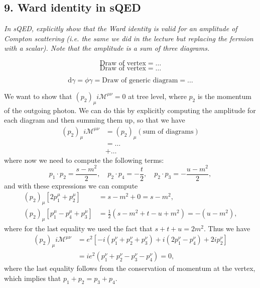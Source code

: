 \subsection*{9. Ward identity in sQED}

\begin{center}
    \textit{In sQED, explicitly show that the Ward identity is valid for an amplitude of Compton scattering (i.e. the same we did in the lecture but replacing the fermion with a scalar). Note that the amplitude is a sum of three diagrams.}
\end{center}

\[
    \text{Draw of vertex} = \dots
\]
\[
    \text{Draw of vertex} = \dots
\]

\[
    \mathrm{d} \gamma = \phi \gamma = \text{Draw of generic diagram} = \dots
\]

We want to show that \((p_2)_\mu i \mathcal{M}^{\mu \nu} = 0\) at tree level, where \(p_2\) is the momentum of the outgoing photon. We can do this by explicitly computing the amplitude for each diagram and then summing them up, so that we have
\[
    \begin{aligned}
        (p_2)_\mu i \mathcal{M}^{\mu \nu} & = (p_2)_\mu (\text{sum of diagrams}) \\
                                          & = \dots                              \\
                                          & + \dots
    \end{aligned}
\]
where now we need to compute the following terms:
\[
    p_1 \cdot p_2 = \frac{s - m^2}{2}, \quad p_2 \cdot p_4 = -\frac{t}{2}, \quad p_2 \cdot p_3 = - \frac{u - m^2}{2},
\]
and with these expressions we can compute
\[
    \begin{aligned}
        (p_2)_\mu [2p_1^{\mu} + p_2^{\mu}]            & = s - m^2 + 0 = s - m^2,                             \\
        (p_2)_\mu [p_1^{\mu} - p_4^{\mu} + p_3^{\mu}] & = \frac{1}{2} (s - m^2 + t - u + m^2) = - (u - m^2),
    \end{aligned}
\]
where for the last equality we used the fact that \(s + t + u = 2 m^2\). Thus we have
\[
    \begin{aligned}
        (p_2)_\mu i \mathcal{M}^{\mu \nu} & = e^2 \left[ -i (p_1^{\nu} + p_2^{\nu} + p_3^{\nu}) + i (2 p_1^{\nu} - p_4^{\nu}) + 2i p_2^{\nu} \right] \\
                                          & = ie^2 (p_1^{\nu} + p_2^{\nu} - p_3^{\nu} - p_4^{\nu}) = 0,
    \end{aligned}
\]
where the last equality follows from the conservation of momentum at the vertex, which implies that \(p_1 + p_2 = p_3 + p_4\).


